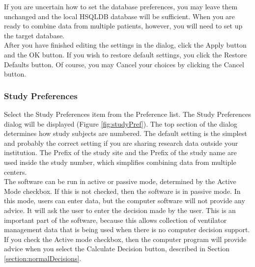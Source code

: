 If you are uncertain how to set the database preferences, you may leave them unchanged and the local HSQLDB 
database will be sufficient.  When you are ready to combine data from multiple patients, however, you will need
to set up the target database.\\

After you have finished editing the settings in the dialog, click the Apply button and the OK button.  If you wish
to restore default settings, you click the Restore Defaults button.  Of course, you may Cancel your choices by
clicking the Cancel button.

\subsubsection{Study Preferences\label{section:studyPreferences}}
Select the Study Preferences item from the Preference list.  The Study Preferences dialog will be displayed
(Figure \vref{fig:studyPref}).
The top section of the dialog determines how study subjects are numbered.  The default setting is the simplest and
probably the correct setting if you are sharing research data outside your institution.  The Prefix of the study
site and the Prefix of the study name are used inside the study number, which simplifies combining data from
multiple centers.\\

The software can be run in active or passive mode, determined by the Active Mode checkbox.  If this is not checked, then
the software is in passive mode.  In this mode, users can enter data, but the computer software will not provide any
advice.  It will ask the user to enter the decision made by the user.  This is an important part of the software, because 
this allows collection of ventilator management data that is being used when there is no computer decision support.\\

If you check the Active mode checkbox, then the computer program will provide advice when you select the Calculate Decision button,
described in Section \vref{section:normalDecisions}. \\ 



